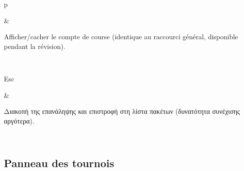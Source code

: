 \documentclass[letterpaper,10pt,greek]{sphinxmanual}
\begin{document}
\begin{savenotes}
\begin{tabular}[t]{}
\begin{varwidth}[t]{}
\sphinxAtStartPar
p
\sphinxbeforeendvarwidth
\end{varwidth}%
&\begin{varwidth}[t]{}
\sphinxAtStartPar
Afficher/cacher le compte de course (identique au raccourci général, disponible pendant la révision).
\sphinxbeforeendvarwidth
\end{varwidth}%
\\
\sphinxhline\begin{varwidth}[t]{}
\sphinxAtStartPar
Esc
\sphinxbeforeendvarwidth
\end{varwidth}%
&\begin{varwidth}[t]{}
\sphinxAtStartPar
Διακοπή της επανάληψης και επιστροφή στη λίστα πακέτων (δυνατότητα συνέχισης αργότερα).
\sphinxbeforeendvarwidth
\end{varwidth}%
\\
\sphinxbottomrule
\end{tabular}
\sphinxtableafterendhook\par
\sphinxattableend\end{savenotes}


\subsection{Panneau des tournois}
\label{\detokenize{raccourcis:panneau-des-tournois}}\label{\detokenize{raccourcis:raccourcis-tournament-panel}}
\end{document}
